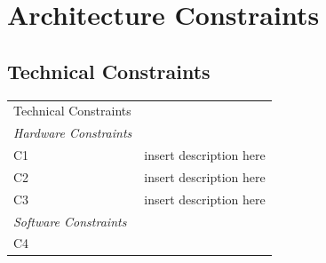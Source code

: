 \documentclass[]{article}
\begin{document}
\section{Architecture Constraints}

\subsection{Technical Constraints}

\begin{longtable}[c]{@{}ll@{}}
\toprule\addlinespace
\begin{minipage}[b]{0.19\columnwidth}\raggedright
Technical Constraints
\end{minipage}
\\\addlinespace
\midrule\endhead
\begin{minipage}[t]{0.19\columnwidth}\raggedright
\emph{Hardware Constraints}
\end{minipage}
\\\addlinespace
\begin{minipage}[t]{0.19\columnwidth}\raggedright
C1
\end{minipage} & \begin{minipage}[t]{0.75\columnwidth}\raggedright
insert description here
\end{minipage}
\\\addlinespace
\begin{minipage}[t]{0.19\columnwidth}\raggedright
C2
\end{minipage} & \begin{minipage}[t]{0.75\columnwidth}\raggedright
insert description here
\end{minipage}
\\\addlinespace
\begin{minipage}[t]{0.19\columnwidth}\raggedright
C3
\end{minipage} & \begin{minipage}[t]{0.75\columnwidth}\raggedright
insert description here
\end{minipage}
\\\addlinespace
\begin{minipage}[t]{0.19\columnwidth}\raggedright
\emph{Software Constraints}
\end{minipage}
\\\addlinespace
\begin{minipage}[t]{0.19\columnwidth}\raggedright
C4
\end{minipage} & \begin{minipage}[t]{0.75\columnwidth}\raggedright

\end{minipage}
\end{longtable}
\end{document}
